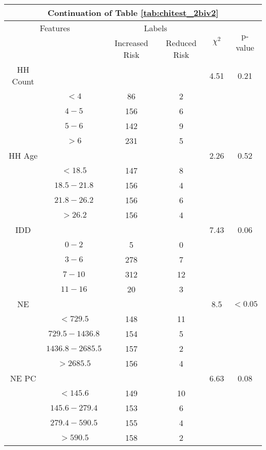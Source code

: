 \begin{table}
\centering
\label{tab:chitest_2biv2_cont}
\begin{tabular}{c c | c c| c | c}
\hline
\multicolumn{6}{c}{Continuation of Table \ref{tab:chitest_2biv2}}\\ 
\hline
\multicolumn{2}{c|}{Features}& \multicolumn{2}{c|}{Labels}& \multirow{2}{*}{$\chi^2$} & \multirow{2}{*}{p-value}\\ 
& & Increased Risk & Reduced Risk & & \\ 
\hline
HH Count &  &  & & 4.51 & 0.21 \\ 
& $< 4$ & 86 & 2& & \\ 
& $4-5$ & 156 & 6& & \\ 
& $5-6$ & 142 & 9& & \\ 
& $> 6$ & 231 & 5& & \\ 
\hline 
HH Age &  &  & & 2.26 & 0.52 \\ 
& $< 18.5$ & 147 & 8& & \\ 
& $18.5-21.8$ & 156 & 4& & \\ 
& $21.8-26.2$ & 156 & 6& & \\ 
& $> 26.2$ & 156 & 4& & \\ 
\hline 
IDD &  &  & & 7.43 & 0.06 \\ 
& $0-2$ & 5 & 0& & \\ 
& $3-6$ & 278 & 7& & \\ 
& $7-10$ & 312 & 12& & \\ 
& $11-16$ & 20 & 3& & \\ 
\hline 
NE &  &  & & 8.5 & $< 0.05$ \\ 
& $< 729.5$ & 148 & 11& & \\ 
& $729.5-1436.8$ & 154 & 5& & \\ 
& $1436.8-2685.5$ & 157 & 2& & \\ 
& $> 2685.5$ & 156 & 4& & \\ 
\hline 
NE PC &  &  & & 6.63 & 0.08 \\ 
& $< 145.6$ & 149 & 10& & \\ 
& $145.6-279.4$ & 153 & 6& & \\ 
& $279.4-590.5$ & 155 & 4& & \\ 
& $> 590.5$ & 158 & 2& & \\ 
\hline 
\end{tabular}
\end{table}


